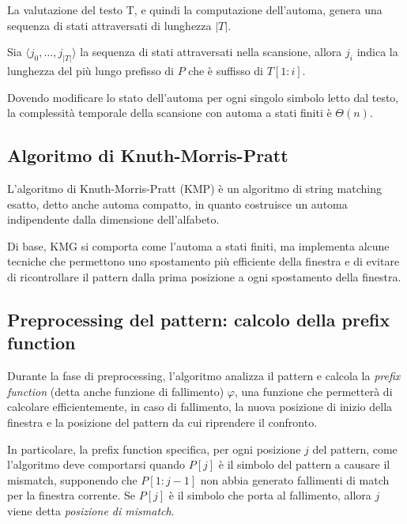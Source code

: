 La valutazione del testo T, e quindi la computazione dell'automa, genera una sequenza di stati attraversati di lunghezza $|T|$.

\begin{thm}
    Sia $\langle j_0, \ldots, j_{|T|} \rangle$ la sequenza di stati attraversati nella scansione, allora $j_i$ indica la lunghezza del più lungo prefisso di $P$ che è suffisso di $T[1:i]$.
\end{thm}
Dovendo modificare lo stato dell'automa per ogni singolo simbolo letto dal testo, la complessità temporale della scansione con automa a stati finiti è $\Theta(n)$.



\subsection{Algoritmo di Knuth-Morris-Pratt}
L'algoritmo di Knuth-Morris-Pratt (KMP) è un algoritmo di string matching esatto, detto anche automa compatto, in quanto costruisce un automa indipendente dalla dimensione dell'alfabeto.

Di base, KMG si comporta come l'automa a stati finiti, ma implementa alcune tecniche che permettono uno spostamento più efficiente della finestra e di evitare di ricontrollare il pattern dalla prima posizione a ogni spostamento della finestra.

\subsection*{Preprocessing del pattern: calcolo della prefix function}
Durante la fase di preprocessing, l'algoritmo analizza il pattern e calcola la \textit{prefix function} (detta anche funzione di fallimento) $\varphi$, una funzione che permetterà di calcolare efficientemente, in caso di fallimento, la nuova posizione di inizio della finestra e la posizione del pattern da cui riprendere il confronto.

In particolare, la prefix function specifica, per ogni posizione $j$ del pattern, come l'algoritmo deve comportarsi quando $P[j]$ è il simbolo del pattern a causare il mismatch, supponendo che $P[1:j-1]$ non abbia generato fallimenti di match per la finestra corrente.
Se $P[j]$ è il simbolo che porta al fallimento, allora $j$ viene detta \textit{posizione di mismatch}.

